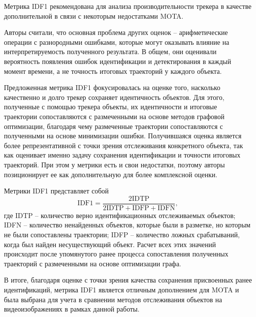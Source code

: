 Метрика IDF1 \cite{ristani2016performance} рекомендована для анализа производительности трекера в качестве дополнительной в связи с некоторым недостатками MOTA.

Авторы считали, что основная проблема других оценок -- арифметические операции с разнородными ошибками, которые могут оказывать влияние на интерпретируемость полученного результата. В общем, они оценивали вероятность появления ошибок идентификации и детектирования в каждый момент времени, а не точность итоговых траекторий у каждого объекта. 

Предложенная метрика IDF1 фокусировалась на оценке того, насколько качественно и долго трекер сохраняет идентичность объектов. Для этого, полученные с помощью трекера объекты, их идентичности и итоговые траектории сопоставляются с размеченными на основе методов графовой оптимизации, благодаря чему размеченные траектории сопоставляются с полученными на основе минимизации ошибки. Получившаяся оценка является более репрезентативной с точки зрения отслеживания конкретного объекта, так как оценивает именно задачу сохранения идентификации и точности итоговых траекторий.  
При этом у метрики есть и свои недостатки, поэтому авторы позиционирует ее как дополнительную для более комплексной оценки. 

Метрики IDF1 представляет собой
\begin{equation}
    \label{eq:idf1}
    \text{IDF1} = \frac{2 \text{IDTP}}{2\text{IDTP} + \text{IDFP} + \text{IDFN}},
\end{equation}
где IDTP -- количество верно идентификационных отслеживаемых объектов; IDFN -- количество ненайденных объектов, которые были в разметке, но которым не были сопоставлены траектории; IDFP -- количество ложных срабатываний, когда был найден несуществующий объект. 
Расчет всех этих значений происходит после упомянутого ранее процесса сопоставления полученных траекторий с размеченными на основе оптимизации графа. 


В итоге, благодаря оценке с точки зрения качества сохранения присвоенных ранее идентификаций, метрика IDF1 является отличным дополнением для MOTA и была выбрана для учета в сравнении методов отслеживания объектов на видеоизображениях в рамках данной работы.
